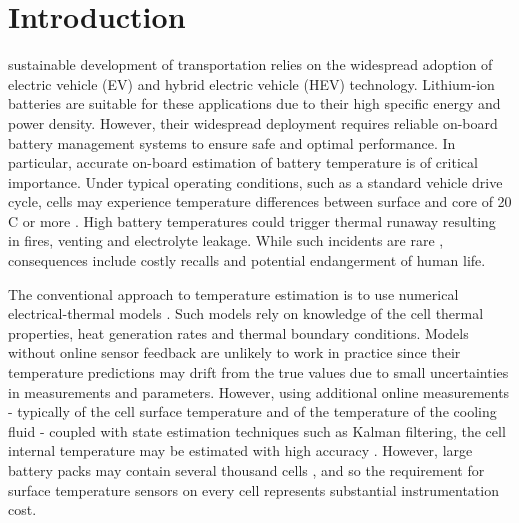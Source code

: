 \documentclass[journal, english]{IEEEtran}
\begin{document}
\section{Introduction\label{sec:Introduction}}
 sustainable development of transportation relies on the widespread adoption of electric vehicle (EV) and hybrid electric vehicle (HEV) technology. Lithium-ion batteries are suitable for these applications due to their high specific energy and power density. However, their widespread deployment requires reliable on-board battery management systems to ensure  safe and optimal performance. In particular, accurate on-board estimation of battery temperature is of critical importance.
Under typical operating conditions, such as a standard vehicle drive cycle,
cells may experience temperature differences between surface and core
of 20 C or more \cite{Kim2009}. High battery temperatures
could trigger thermal runaway resulting in fires,
venting and electrolyte leakage. While such incidents are rare \cite{Wang2012a},
consequences include costly recalls and potential endangerment of
human life.


The conventional approach to temperature estimation is to use numerical
electrical-thermal models \cite{Forgez2010a,Kim2014b,Lin2013f,Kim2013,Lin2014}.
Such models rely on knowledge of the cell thermal properties, heat
generation rates and thermal boundary conditions. Models without online sensor
feedback are unlikely to work in practice since their temperature
predictions may drift from the true values due to small uncertainties
in measurements and parameters. However, using additional online measurements - typically of the cell surface temperature and of the temperature
of the cooling fluid - coupled with state estimation techniques such
as Kalman filtering, the cell internal temperature may be estimated
with high accuracy \cite{Kim2014b,Lin2013f,Kim2013,Lin2014}. However,
large battery packs may contain several thousand cells \cite{Pesaran2009},
and so the requirement for surface temperature sensors on every cell
represents substantial instrumentation cost.
\end{document}

